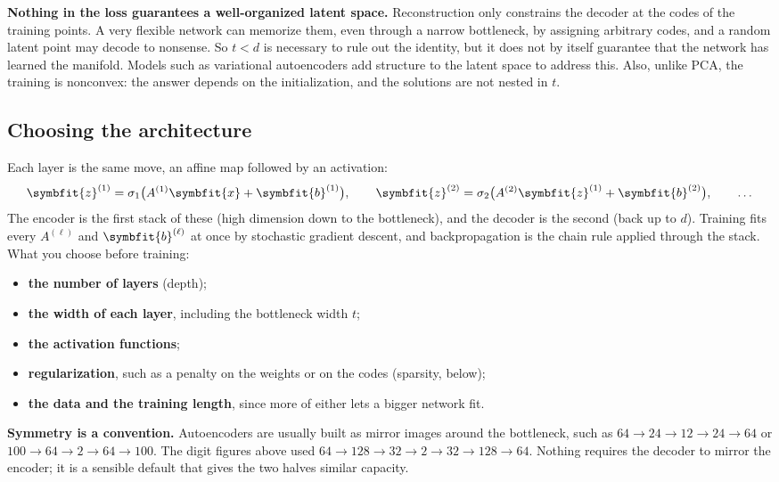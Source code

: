 \documentclass[11pt]{article}
\newcommand{\bm}[1]{\symbfit{#1}}
\newcommand{\vx}{\bm{x}}
\begin{document}
\begin{careful}
\textbf{Nothing in the loss guarantees a well-organized latent space.} Reconstruction only constrains the decoder at the codes of the training points. A very flexible network can memorize them, even through a narrow bottleneck, by assigning arbitrary codes, and a random latent point may decode to nonsense. So $t<d$ is necessary to rule out the identity, but it does not by itself guarantee that the network has learned the manifold. Models such as variational autoencoders add structure to the latent space to address this. Also, unlike PCA, the training is nonconvex: the answer depends on the initialization, and the solutions are not nested in $t$.
\end{careful}

\subsection{Choosing the architecture}

Each layer is the same move, an affine map followed by an activation:
\[
\bm z^{(1)}=\sigma_1\big(A^{(1)}\vx+\bm b^{(1)}\big),\qquad \bm z^{(2)}=\sigma_2\big(A^{(2)}\bm z^{(1)}+\bm b^{(2)}\big),\qquad\dots
\]
The encoder is the first stack of these (high dimension down to the bottleneck), and the decoder is the second (back up to $d$). Training fits every $A^{(\ell)}$ and $\bm b^{(\ell)}$ at once by stochastic gradient descent, and backpropagation is the chain rule applied through the stack. What you choose before training:
\begin{itemize}[nosep]
\item \textbf{the number of layers} (depth);
\item \textbf{the width of each layer}, including the bottleneck width $t$;
\item \textbf{the activation functions};
\item \textbf{regularization}, such as a penalty on the weights or on the codes (sparsity, below);
\item \textbf{the data and the training length}, since more of either lets a bigger network fit.
\end{itemize}

\textbf{Symmetry is a convention.} Autoencoders are usually built as mirror images around the bottleneck, such as $64\to24\to12\to24\to64$ or $100\to64\to2\to64\to100$. The digit figures above used $64\to128\to32\to2\to32\to128\to64$. Nothing requires the decoder to mirror the encoder; it is a sensible default that gives the two halves similar capacity.
\end{document}
